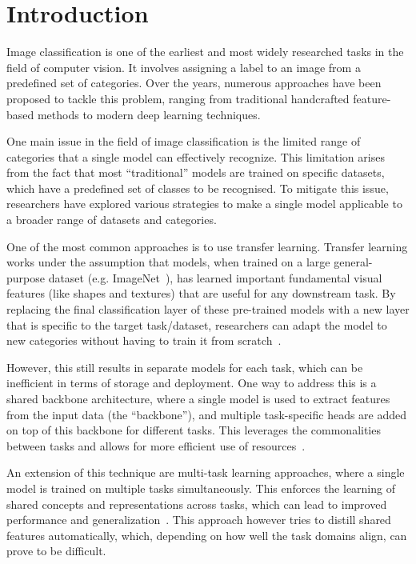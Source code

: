 \chapter{Introduction}


Image classification is one of the earliest and most widely researched tasks in the field of computer vision.
It involves assigning a label to an image from a predefined set of categories.
Over the years, numerous approaches have been proposed to tackle this problem, ranging from traditional handcrafted feature-based methods to modern deep learning techniques.

One main issue in the field of image classification is the limited range of categories that a single model can effectively recognize.
This limitation arises from the fact that most \enquote{traditional} models are trained on specific datasets, which have a predefined set of classes to be recognised.
To mitigate this issue, researchers have explored various strategies to make a single model applicable to a broader range of datasets and categories.

One of the most common approaches is to use transfer learning.
Transfer learning works under the assumption that models, when trained on a large general-purpose dataset (e.g. ImageNet~\cite{deng_imagenet_2009,russakovsky_imagenet_2015}),
has learned important fundamental visual features (like shapes and textures) that are useful for any downstream task.
By replacing the final classification layer of these pre-trained models with a new layer that is specific to the target task/dataset,
researchers can adapt the model to new categories without having to train it from scratch~\cite{pan_survey_2010,zhuang_comprehensive_2020}.

However, this still results in separate models for each task,
which can be inefficient in terms of storage and deployment.
One way to address this is a shared backbone architecture, where a single model is used to extract features from the input data (the \enquote{backbone}),
and multiple task-specific heads are added on top of this backbone for different tasks.
This leverages the commonalities between tasks and allows for more efficient use of resources~\cite{vaswani_attention_2023}.

An extension of this technique are multi-task learning approaches, where a single model is trained on multiple tasks simultaneously.
This enforces the learning of shared concepts and representations across tasks,
which can lead to improved performance and generalization~\cite{zhang_overview_2018}.
This approach however tries to distill shared features automatically,
which, depending on how well the task domains align, can prove to be difficult.

